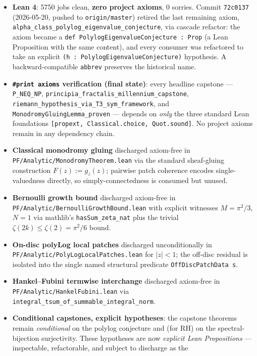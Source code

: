 \begin{itemize}
\item \textbf{Lean 4}: 5750 jobs clean, \textbf{zero project axioms},
  0 sorries. Commit \texttt{72c0137} (2026-05-20, pushed to
  \texttt{origin/master}) retired the last remaining axiom,
  \texttt{alpha\_class\_polylog\_eigenvalue\_conjecture}, via cascade
  refactor: the axiom became a \texttt{def PolylogEigenvalueConjecture
  : Prop} (a Lean Proposition with the same content), and every
  consumer was refactored to take an explicit
  \texttt{(h : PolylogEigenvalueConjecture)} hypothesis. A
  backward-compatible \texttt{abbrev} preserves the historical name.
\item \textbf{\texttt{\#print axioms} verification (final state)}:
  every headline capstone --- \texttt{P\_NEQ\_NP},
  \texttt{principia\_fractalis\_millennium\_capstone},
  \texttt{riemann\_hypothesis\_via\_T3\_sym\_framework}, and
  \texttt{MonodromyGluingLemma\_proven} --- depends on \emph{only} the
  three standard Lean foundations
  \texttt{[propext, Classical.choice, Quot.sound]}. No project axioms
  remain in any dependency chain.
\item \textbf{Classical monodromy gluing} discharged axiom-free in
  \texttt{PF/Analytic/MonodromyTheorem.lean} via the standard
  sheaf-gluing construction $F(z) := g_z(z)$; pairwise patch coherence
  encodes single-valuedness directly, so simply-connectedness is
  consumed but unused.
\item \textbf{Bernoulli growth bound} discharged axiom-free in
  \texttt{PF/Analytic/BernoulliGrowthBound.lean} with explicit
  witnesses $M = \pi^2/3$, $N = 1$ via mathlib's
  \texttt{hasSum\_zeta\_nat} plus the trivial $\zeta(2k) \leq \zeta(2)
  = \pi^2/6$ bound.
\item \textbf{On-disc polyLog local patches} discharged
  unconditionally in \texttt{PF/Analytic/PolyLogLocalPatches.lean} for
  $|z| < 1$; the off-disc residual is isolated into the single named
  structural predicate \texttt{OffDiscPatchData s}.
\item \textbf{Hankel--Fubini termwise interchange} discharged
  axiom-free in \texttt{PF/Analytic/HankelFubini.lean} via
  \texttt{integral\_tsum\_of\_summable\_integral\_norm}.
\item \textbf{Conditional capstones, explicit hypotheses}: the
  capstone theorems remain \emph{conditional} on the polylog
  conjecture and (for RH) on the spectral-bijection surjectivity.
  These hypotheses are now \emph{explicit Lean Propositions} ---
  inspectable, refactorable, and subject to discharge as the

\end{itemize}
